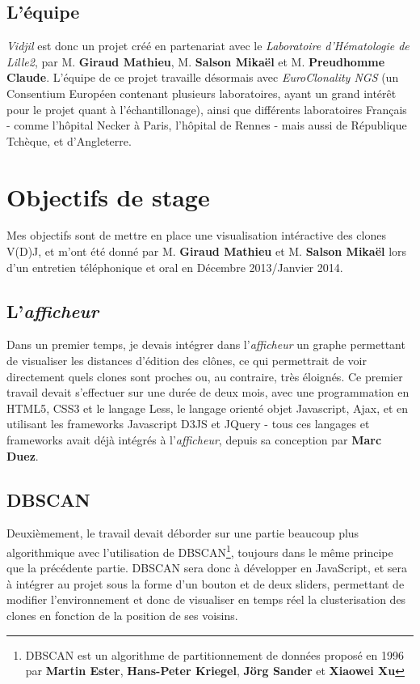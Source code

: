 \documentclass[12pt]{report}
\begin{document}
\begin{spacing}{1.2}
\subsection{L'équipe}
\textit{Vidjil} est donc un projet créé en partenariat avec le \textit{Laboratoire d'Hématologie de Lille2}, par M. \textbf{Giraud Mathieu}, M. \textbf{Salson Mikaël} et M. \textbf{Preudhomme Claude}.
\newline
L'équipe de ce projet travaille désormais avec \textit{EuroClonality NGS} (un Consentium Européen contenant plusieurs laboratoires, ayant un grand intérêt pour le projet quant à l'échantillonage), ainsi que différents laboratoires Français - comme l'hôpital Necker à Paris, l'hôpital de Rennes - mais aussi de République Tchèque, et d'Angleterre.

\section{Objectifs de stage}
Mes objectifs sont de mettre en place une visualisation intéractive des clones V(D)J, et m'ont été donné par M. \textbf{Giraud Mathieu} et M. \textbf{Salson Mikaël} lors d'un entretien téléphonique et oral en Décembre 2013/Janvier 2014.

\subsection{L'\textit{afficheur}}
Dans un premier temps, je devais intégrer dans l'\textit{afficheur} un graphe permettant de visualiser les distances d'édition des clônes, ce qui permettrait de voir directement quels clones sont proches ou, au contraire, très éloignés.
\newline
Ce premier travail devait s'effectuer sur une durée de deux mois, avec une programmation en HTML5, CSS3 et le langage Less, le langage orienté objet Javascript, Ajax, et en utilisant les frameworks Javascript D3JS et JQuery - tous ces langages et frameworks avait déjà intégrés à l'\textit{afficheur}, depuis sa conception par \textbf{Marc Duez}.
\subsection{DBSCAN}
Deuxièmement, le travail devait déborder sur une partie beaucoup plus algorithmique avec l'utilisation de DBSCAN\footnote{DBSCAN est un algorithme de partitionnement de données proposé en 1996 par \textbf{Martin Ester}, \textbf{Hans-Peter Kriegel}, \textbf{Jörg Sander} et \textbf{Xiaowei Xu}}, toujours dans le même principe que la précédente partie.
\newline
DBSCAN sera donc à développer en JavaScript, et sera à intégrer au projet sous la forme d'un bouton et de deux sliders, permettant de modifier l'environnement et donc de visualiser en temps réel la clusterisation des clones en fonction de la position de ses voisins.


\end{spacing}
\end{document}
